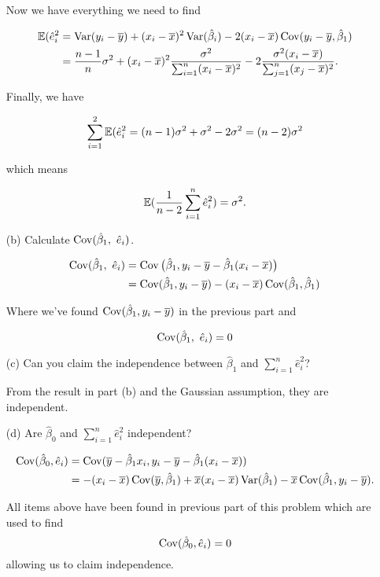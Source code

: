 \documentclass{tufte-book}
\begin{document}
\begin{enumerate}
Now we have everything we need to find

\begin{align*}
\operatorname{\mathbb{E}}(\hat{e}_i^2 &= \operatorname{Var}(y_i-\overline{y}) + (x_i-\overline{x})^2\operatorname{Var}(\hat{\beta}_i) - 2(x_i-\overline{x})\operatorname{Cov}(y_i-\overline{y}, \hat{\beta}_1)\\
&= \frac{n-1}{n}\sigma^2  + (x_i-\overline{x})^2\frac{\sigma^2}{\sum_{i=1}^n(x_i-\overline{x})^2} - 2\frac{\sigma^2(x_i-\overline{x})}{\sum_{j=1}^n(x_j-\overline{x})^2}.\\
\end{align*}

Finally, we have

\[ \sum_{i=1}^2 \operatorname{\mathbb{E}}(\hat{e}_i^2 = (n-1)\sigma^2 +\sigma^2 -2\sigma^2 = (n-2)\sigma^2 \]

which means

\[ \operatorname{\mathbb{E}}(\frac{1}{n-2}\sum_{i=1}^n \hat{e}_i^2) = \sigma^2. \]

\item[(b)] Calculate $\operatorname{Cov}(\hat{\beta}_1, \ \hat{e}_i)$.

\begin{align*}
\operatorname{Cov}(\hat{\beta}_1, \ \hat{e}_i) &= \operatorname{Cov}\big(\hat{\beta}_1, y_i-\overline{y}-\hat{\beta}_1(x_i-\overline{x})\big)\\
&= \operatorname{Cov}(\hat{\beta}_1, y_i-\overline{y})-(x_i-\overline{x})\operatorname{Cov}(\hat{\beta}_1,\hat{\beta}_1)\\
\end{align*}

Where we've found $\operatorname{Cov}(\hat{\beta}_1, y_i-\overline{y})$ in the previous part and

\[ \operatorname{Cov}(\hat{\beta}_1, \ \hat{e}_i) = 0 \]

\item[(c)] Can you claim the independence between $\hat{\beta}_1$ and $\sum_{i=1}^n \hat{e}_i^2$?

From the result in part (b) and the Gaussian assumption, they are independent.

\item[(d)] Are $\hat{\beta}_0$ and $\sum_{i=1}^n \hat{e}_i^2$ independent?

\begin{align*}
\operatorname{Cov}(\hat{\beta}_0, \hat{e}_i) &= \operatorname{Cov}(\overline{y}-\hat{\beta}_1x_i,y_i-\overline{y}-\hat{\beta}_1(x_i-\overline{x}))\\
&= -(x_i-\overline{x})\operatorname{Cov}(\overline{y},\hat{\beta}_1) + \overline{x}(x_i-\overline{x})\operatorname{Var}(\hat{\beta}_1)-\overline{x}\operatorname{Cov}(\hat{\beta}_1, y_i-\overline{y}).
\end{align*}

All items above have been found in previous part of this problem which are used to find
\[ \operatorname{Cov}(\hat{\beta}_0, \hat{e}_i) = 0\]
allowing us to claim independence.

\end{enumerate}
\end{document}
